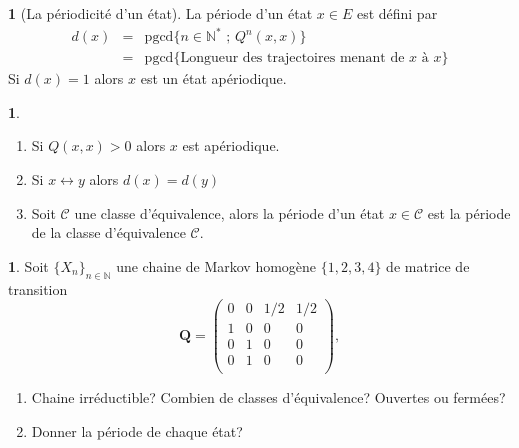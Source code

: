 \documentclass[8pt,notheorems]{beamer}
\def \N{\mathbb N}
\theoremstyle{definition}
\newtheorem{definition}{\translate{Definition}}
\theoremstyle{example}
\newtheorem{example}{\translate{Exemple}}
\newtheorem{remark}{\translate{Remarque}}
\theoremstyle{mystyle}
\theoremstyle{plain}
\begin{document}
\begin{frame}[allowframebreaks]
\begin{definition}[La périodicité d'un état]
La période d'un état $x\in E$ est défini par
\begin{eqnarray*}
d(x)&=&\text{pgcd}\{n\in\mathbb{N^{*}}\text{ ; }Q^{n}(x,x)\}\\
&=&\text{pgcd}\{\text{Longueur des trajectoires menant de $x$ à $x$}\}
\end{eqnarray*}
Si $d(x)=1$ alors $x$ est un état apériodique.
\end{definition}
\begin{remark}
\begin{enumerate}
\item Si $Q(x,x)>0$ alors $x$ est apériodique.
\item Si $x\leftrightarrow y$ alors $d(x)=d(y)$
\item Soit $\mathcal{C}$ une classe d'équivalence, alors la période d'un état $x\in\mathcal{C}$ est la période de la classe d'équivalence $\mathcal{C}$.
\end{enumerate}
\end{remark}
\begin{example}
Soit $\{X_n\}_{n\in\N}$ une chaine de Markov homogène $\{1,2,3,4\}$ de matrice de transition
\begin{equation*}
\mathbf{Q}=
\left(\begin{array}{cccc}
0&0&1/2&1/2\\
1&0&0&0\\
0&1&0&0\\
0&1&0&0\\
\end{array}
\right),
\end{equation*}
\begin{enumerate}
\item Chaine irréductible? Combien de classes d'équivalence? Ouvertes ou fermées?
\item Donner la période de chaque état?
\end{enumerate}
\end{example}
\end{frame}
\end{document}
